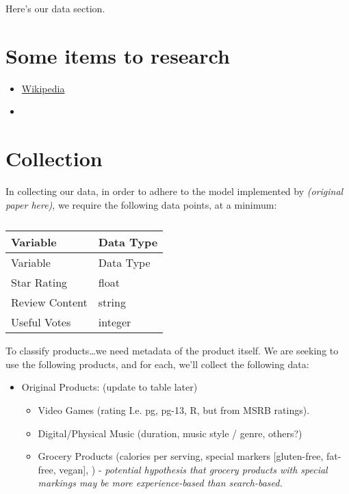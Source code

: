 \documentclass[
  letterpaper,
  DIV=11,
  numbers=noendperiod]{scrreprt}
\begin{document}
Here's our data section.

\section{Some items to research}\label{some-items-to-research}

\begin{itemize}
\item
  \href{https://en.wikipedia.org/wiki/SEC_classification_of_goods_and_services}{Wikipedia}
\item
\end{itemize}

\section{Collection}\label{collection}

In collecting our data, in order to adhere to the model implemented by
\emph{(original paper here)}, we require the following data points, at a
minimum:

\begin{longtable}[]{@{}ll@{}}
\caption{}\label{T_68bd3}\tabularnewline
\toprule\noalign{}
Variable & Data Type \\
\midrule\noalign{}
\endfirsthead
\toprule\noalign{}
Variable & Data Type \\
\midrule\noalign{}
\endhead
\bottomrule\noalign{}
\endlastfoot
Star Rating & float \\
Review Content & string \\
Useful Votes & integer \\
\end{longtable}

To classify products\ldots we need metadata of the product itself. We
are seeking to use the following products, and for each, we'll collect
the following data:

\begin{itemize}
\item
  Original Products: (update to table later)

  \begin{itemize}
  \item
    Video Games (rating I.e. pg, pg-13, R, but from MSRB ratings).
  \item
    Digital/Physical Music (duration, music style / genre, others?)
  \item
    Grocery Products (calories per serving, special markers
    {[}gluten-free, fat-free, vegan{]}, ) - \emph{potential hypothesis
    that grocery products with special markings may be more
    experience-based than search-based.}
  \end{itemize}
\end{itemize}
\end{document}

